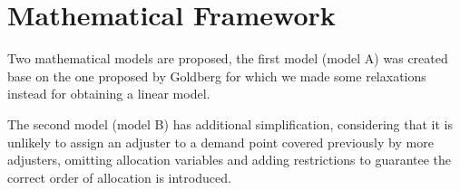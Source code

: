 \section{Mathematical Framework}

Two mathematical models are proposed,
the first model (model A) was created
base on the one proposed by Goldberg \cite{goldberg1990validating}
for which
we made some relaxations
instead for obtaining a linear model.

The second model (model B)
has additional simplification,
considering that
it is unlikely
to assign an adjuster
to a demand point
covered previously
by more adjusters,
omitting allocation variables
and adding restrictions
to guarantee
the correct order of allocation is introduced.
